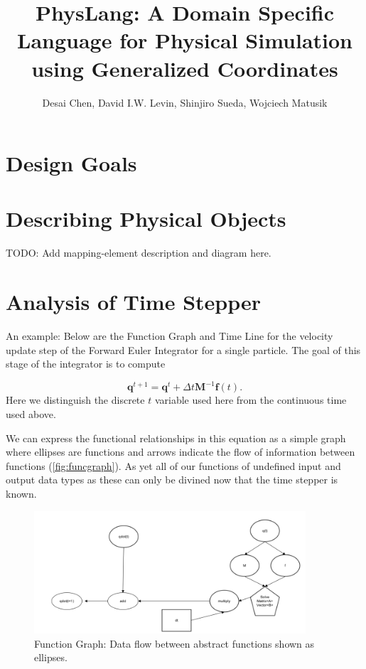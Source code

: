 \documentclass{article}
\title{PhysLang: A Domain Specific Language for Physical Simulation using Generalized Coordinates}
\author{Desai Chen, David I.W. Levin, Shinjiro Sueda, Wojciech Matusik}
\begin{document}
\maketitle

\section{Design Goals}

\section{Describing Physical Objects}
TODO: Add mapping-element description and diagram here.

\section{Analysis of Time Stepper}

An example: Below are the Function Graph and Time Line for the velocity update step of the Forward Euler Integrator for a single particle. The goal of this stage of the integrator is to compute

\begin{equation}
\mathbf{q}^{t+1} = \mathbf{q}^t + \Delta t \mathbf{M}^{-1}\mathbf{f}\left(t\right). 
\end{equation}  Here we distinguish the discrete $t$ variable used here from the continuous time used above.  

We can express the functional relationships  in this equation as a simple graph where ellipses are functions and arrows indicate the flow of information between functions (\autoref{fig:funcgraph}). As yet all of our functions of undefined input and output data types as these can only be divined now that the time stepper is known.

\begin{figure}[h]
\includegraphics[width=0.9\textwidth]{figures/functiongraph}
\caption{Function Graph: Data flow between abstract functions shown as ellipses. }
\label{fig:funcgraph}
\end{figure}
\end{document}
